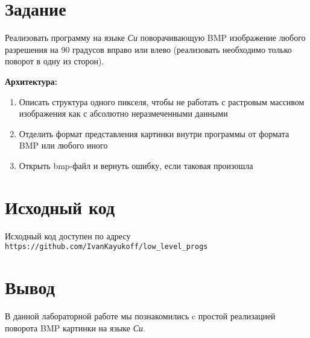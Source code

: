 \documentclass[listings]{labreport}
\begin{document}
\maketitlepage

\section*{Задание}

Реализовать программу на языке \textit{Си} поворачивающую BMP изображение 
любого разрешения на 90 градусов вправо или влево (реализовать необходимо
только поворот в одну из сторон).

\textbf{Архитектура:} \\
\begin{enumerate}
  \item Описать структура одного пикселя, чтобы не работать с растровым 
    массивом изображения как с абсолютно неразмеченными данными
  \item Отделить формат представления картинки внутри программы от формата
    BMP или любого иного
  \item Открыть bmp-файл и вернуть ошибку, если таковая произошла
\end{enumerate}

\section*{Исходный код}

Исходный код доступен по адресу 
\texttt{https://github.com/IvanKayukoff/low\_level\_progs}

\section*{Вывод}

В данной лабораторной работе мы познакомились c простой реализацией поворота
BMP картинки на языке \textit{Си}.
\end{document}
